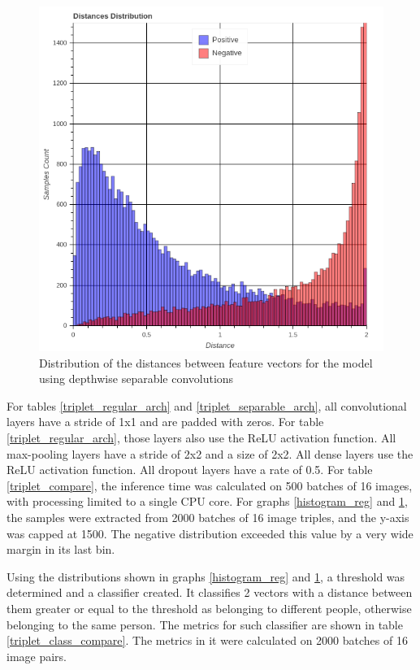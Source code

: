 \documentclass[runningheads]{llncs}
\begin{document}
\begin{figure}
    \begin{center}
        \includegraphics[scale=0.3]{histogram_sep.png}
        \caption{Distribution of the distances between feature vectors for the model using depthwise separable convolutions}
        \label{histogram_sep}
    \end{center}
\end{figure}

For tables \ref{triplet_regular_arch} and \ref{triplet_separable_arch}, all convolutional layers have a stride of 1x1 and are padded with zeros. For table \ref{triplet_regular_arch}, those layers also use the ReLU activation function. All max-pooling layers have a stride of 2x2 and a size of 2x2. All dense layers use the ReLU activation function. All dropout layers have a rate of 0.5. For table \ref{triplet_compare}, the inference time was calculated on 500 batches of 16 images, with processing limited to a single CPU core. For graphs \ref{histogram_reg} and \ref{histogram_sep}, the samples were extracted from 2000 batches of 16 image triples, and the y-axis was capped at 1500. The negative distribution exceeded this value by a very wide margin in its last bin.

Using the distributions shown in graphs \ref{histogram_reg} and \ref{histogram_sep}, a threshold was determined and a classifier created. It classifies 2 vectors with a distance between them greater or equal to the threshold as belonging to different people, otherwise belonging to the same person. The metrics for such classifier are shown in table \ref{triplet_class_compare}. The metrics in it were calculated on 2000 batches of 16 image pairs.
\end{document}
